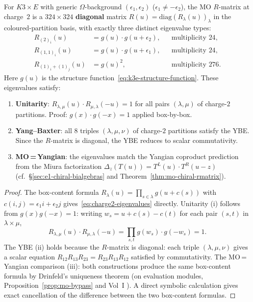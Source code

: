 \begin{proposition}
\label{prop:mo-rmatrix-charge2}
\label{prop:charge2-rmatrix}
For $K3 \times E$ with generic $\Omega$-background
$(\epsilon_1, \epsilon_2)$ ($\epsilon_1 \neq - \epsilon_2$),
the MO $R$-matrix at charge~$2$ is a $324 \times 324$
\textbf{diagonal} matrix
$R(u) = \mathrm{diag}(R_\lambda(u))_{\lambda}$
in the coloured-partition basis,
with exactly three distinct eigenvalue types:
\begin{align}
\label{eq:charge2-eigenvalues}
 R_{(2)_i}(u) &= g(u) \cdot g(u + \epsilon_2),
 &&\text{multiplicity } 24, \\
 R_{(1,1)_i}(u) &= g(u) \cdot g(u + \epsilon_1),
 &&\text{multiplicity } 24, \nonumber \\
 R_{(1)_i + (1)_j}(u) &= g(u)^2,
 &&\text{multiplicity } 276. \nonumber
\end{align}
Here $g(u)$ is the structure
function~\eqref{eq:k3e-structure-function}.
These eigenvalues satisfy:
\begin{enumerate}[label=\textup{(\roman*)}]
 \item \textbf{Unitarity}: $R_{\lambda,\mu}(u) \cdot R_{\mu,\lambda}(-u) = 1$
 for all pairs $(\lambda, \mu)$ of charge-$2$ partitions.
 Proof: $g(x) \cdot g(-x) = 1$ applied box-by-box.
 \item \textbf{Yang--Baxter}: all $8$ triples $(\lambda, \mu, \nu)$
 of charge-$2$ partitions satisfy the YBE\@.
 Since the $R$-matrix is diagonal, the YBE reduces to
 scalar commutativity.
 \item \textbf{MO\,=\,Yangian}: the eigenvalues match the
 Yangian coproduct prediction from the Miura factorization
 $\Delta_z(T(u)) = T^L(u) \cdot T^R(u - z)$ (cf.\
 \S\ref{sec:e1-chiral-bialgebras} and
 Theorem~\ref{thm:mo-chiral-rmatrix}).
\end{enumerate}
\end{proposition}

\begin{proof}
The box-content formula
$R_\lambda(u) = \prod_{s \in \lambda} g(u + c(s))$
with $c(i,j) = \epsilon_1 i + \epsilon_2 j$
gives~\eqref{eq:charge2-eigenvalues} directly.
Unitarity (i) follows from $g(x) g(-x) = 1$:
writing $w_s = u + c(s) - c(t)$ for
each pair $(s,t)$ in $\lambda \times \mu$,
\[
 R_{\lambda,\mu}(u) \cdot R_{\mu,\lambda}(-u)
 = \prod_{s, t} g(w_s) \cdot g(-w_s) = 1.
\]
The YBE (ii) holds because the $R$-matrix is diagonal:
each triple $(\lambda, \mu, \nu)$ gives a scalar equation
$R_{12} R_{13} R_{23} = R_{23} R_{13} R_{12}$
satisfied by commutativity.
The MO\,=\,Yangian comparison (iii): both constructions produce
the same box-content formula by Drinfeld's uniqueness theorem
(on evaluation modules, Proposition~\ref{prop:mo-bypass} and
Vol~I \cite{VolI}).
A direct symbolic calculation gives exact cancellation of the
difference between the two box-content formulas.
\end{proof}

